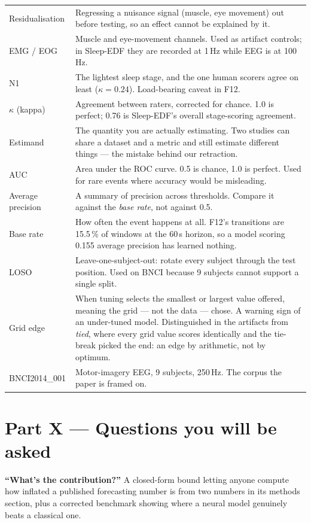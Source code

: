 \documentclass[11pt]{article}
\begin{document}
\begin{center}
\begin{longtable}{p{}p{}}
Residualisation & Regressing a nuisance signal (muscle, eye movement) out before testing, so an effect cannot be explained by it. \\
EMG / EOG & Muscle and eye-movement channels. Used as artifact controls; in Sleep-EDF they are recorded at 1\,Hz while EEG is at 100\,Hz. \\
N1 & The lightest sleep stage, and the one human scorers agree on least ($\kappa = 0.24$). Load-bearing caveat in F12. \\
$\kappa$ (kappa) & Agreement between raters, corrected for chance. 1.0 is perfect; 0.76 is Sleep-EDF's overall stage-scoring agreement. \\
Estimand & The quantity you are actually estimating. Two studies can share a dataset and a metric and still estimate different things --- the mistake behind our retraction. \\
AUC & Area under the ROC curve. 0.5 is chance, 1.0 is perfect. Used for rare events where accuracy would be misleading. \\
Average precision & A summary of precision across thresholds. Compare it against the \emph{base rate}, not against 0.5. \\
Base rate & How often the event happens at all. F12's transitions are 15.5\,\% of windows at the 60\,s horizon, so a model scoring 0.155 average precision has learned nothing. \\
LOSO & Leave-one-subject-out: rotate every subject through the test position. Used on BNCI because 9 subjects cannot support a single split. \\
Grid edge & When tuning selects the smallest or largest value offered, meaning the grid --- not the data --- chose. A warning sign of an under-tuned model. Distinguished in the artifacts from \emph{tied}, where every grid value scores identically and the tie-break picked the end: an edge by arithmetic, not by optimum. \\
BNCI2014\_001 & Motor-imagery EEG, 9 subjects, 250\,Hz. The corpus the paper is framed on. \\
\bottomrule
\end{longtable}
\end{center}

\section{Part X --- Questions you will be asked}

\textbf{``What's the contribution?''} A closed-form bound letting anyone compute
how inflated a published forecasting number is from two numbers in its methods
section, plus a corrected benchmark showing where a neural model genuinely beats a
classical one.
\end{document}
